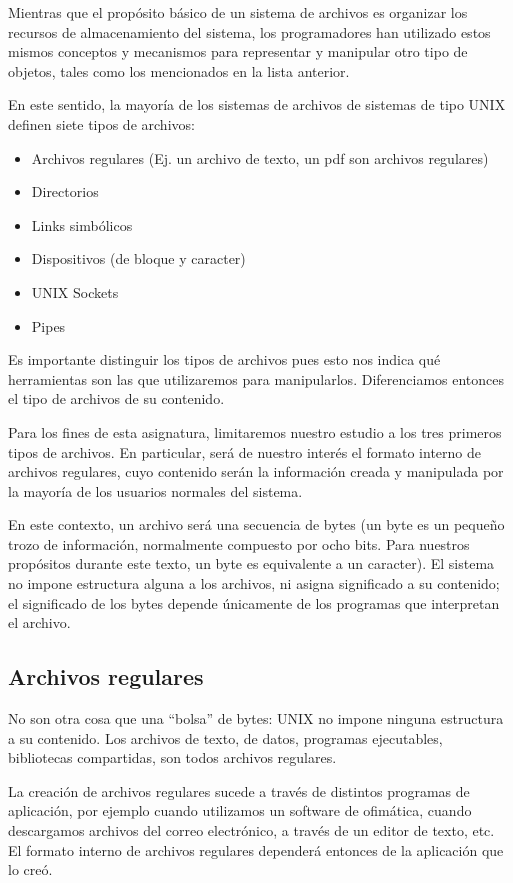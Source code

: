 \documentclass[12pt]{article}
\begin{document}
Mientras que el propósito básico de un sistema de archivos es organizar 
los recursos de almacenamiento del  sistema, los programadores han utilizado
estos mismos conceptos y mecanismos para representar y manipular otro tipo 
de objetos, tales como los mencionados en la lista anterior. 

En este sentido, la mayoría de los sistemas de archivos de sistemas de 
tipo UNIX definen siete tipos de archivos:

\begin{itemize}
\item Archivos regulares (Ej. un archivo de texto, un pdf son archivos regulares)
\item Directorios
\item Links simbólicos
\item Dispositivos (de bloque y caracter) 
\item UNIX Sockets  
\item Pipes 
\end{itemize}

Es importante distinguir los tipos de archivos pues esto nos indica qué 
herramientas son las que utilizaremos para manipularlos. Diferenciamos 
entonces el tipo de archivos de su contenido.   

Para los fines de esta asignatura, limitaremos nuestro estudio a los tres 
primeros tipos de archivos. En particular, será de nuestro interés el 
formato interno de archivos regulares, cuyo contenido serán la información 
creada y manipulada por la mayoría de los usuarios normales del sistema.  

En este contexto, un archivo será una secuencia de bytes (un byte es un 
pequeño trozo de información, normalmente compuesto por ocho bits. Para 
nuestros propósitos durante este texto, un byte es equivalente a un 
caracter). El sistema no impone estructura alguna a los archivos, ni 
asigna significado a su contenido; el significado de los bytes depende 
únicamente de los programas que interpretan el archivo. 

\subsection*{Archivos regulares}
No son otra cosa que una ``bolsa'' de bytes: UNIX no impone ninguna estructura 
a su contenido. Los archivos de texto, de datos, programas ejecutables, 
bibliotecas compartidas, son todos archivos regulares.

La creación de archivos regulares sucede a través de distintos programas de 
aplicación, por ejemplo cuando utilizamos un software de ofimática, cuando 
descargamos archivos del correo electrónico, a través de un editor de texto, 
etc. El formato interno de archivos regulares dependerá entonces de la 
aplicación que lo creó. 
\end{document}
